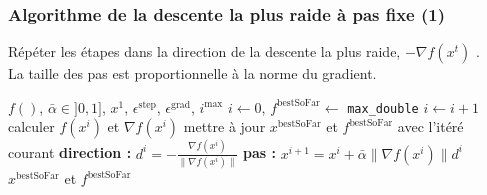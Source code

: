 \documentclass[12pt]{beamer}
\begin{document}
\begin{frame}
\frametitle{Algorithme de la descente la plus raide à pas fixe (1)} 
Répéter les étapes dans la direction de la descente la plus raide, $-\nabla f(x^t)$ \cite{cauchy1847methode,curry1944method}. \\
La taille des pas est proportionnelle à la norme du gradient.
\begin{block}{}
\begin{algorithmic}
\REQUIRE $f()$, $\bar\alpha \in ]0,1]$, $x^1$, $\epsilon^{\text{step}}$, $\epsilon^{\text{grad}}$, $i^{\text{max}}$
\STATE $i \leftarrow 0$, $f^{\text{bestSoFar}} \leftarrow$ \texttt{max\_double}
\REPEAT 
\STATE $i \leftarrow i+1$
\STATE calculer $f(x^i)$ et $\nabla f(x^i)$
\STATE mettre à jour $x^{\text{bestSoFar}}$ et $f^{\text{bestSoFar}}$ avec l’itéré courant
\ENDIF
\STATE \textbf{direction : } $d^i = - \frac{\nabla f(x^i)}{\lVert \nabla f(x^i) \rVert}$
\STATE \textbf{pas : } $x^{i+1} = x^i + \bar\alpha \lVert \nabla f(x^i) \rVert d^i$
\RETURN $x^{\text{bestSoFar}}$ et $f^{\text{bestSoFar}}$
\end{algorithmic}
\end{block}
\end{frame}
\end{document}
